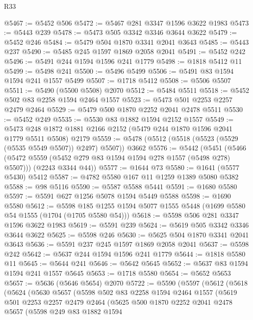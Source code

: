 \begin{lexlean}{R33}
\begin{coremodule}
@5467 := @5452 @506
@5472 := @5467 @281 @3347 @1596 @3622 @1983
@5473 := @5443 @239
@5478 := @5473 @505 @3342 @3346 @3644 @3622
@5479 := @5452 @246
@5484 := @5479 @504 @1870 @3341 @2041 @3643
@5485 := @5443 @237
@5490 := @5485 @245 @1597 @1869 @2058 @2041
@5491 := @5452 @242
@5496 := @5491 @244 @1594 @1596 @241 @1779
@5498 := @1818 @5412 @11
@5499 := @5498 @241
@5500 := @5496 @5499
@5506 := @5491 @83 @1594 @1594 @241 @1557 @5499
@5507 := @1718 @5412
@5508 := @5506 @5507
@5511 := @5490 (@5500 @5508) @2070
@5512 := @5484 @5511
@5518 := @5452 @502 @83 @2258 @1594 @2464 @1557
@5523 := @5473 @501 @2253 @2257 @2479 @2464
@5529 := @5479 @500 @1870 @2252 @2041 @2478 @5511
@5530 := @5452 @249
@5535 := @5530 @83 @1882 @1594 @2152 @1557
@5549 := @5473 @248 @1872 @1881 @2166 @2152 (@5479 @244 @1870 @1596 @2041 @1779 @5511 @5508) @2179
@5559 := @5478 (@5512 (@5518 (@5523 (@5529 (@5535 @5549 @5507)) @2497) @5507)) @3662
@5576 := @5442
    (@5451
      (@5466 (@5472 @5559 (@5452 @279 @83 @1594 @1594 @278 @1557 (@5498 @278) @5507)))
      (@2243 @3344 @44))
@5577 := @1644 @73
@5580 := @1641 (@5577 @5430) @5412
@5587 := @4782 @5580 @167 @11 @1259 @1389 @5080 @5382
@5588 := @98 @5116
@5590 := @5587 @5588 @5441
@5591 := @1680 @5580
@5597 := @5591 @627 @1256 @5078 @1594 @5449 @5588
@5598 := @1690 @5580
@5612 := @5598 @185 @1255 @1594 @5077 @1555 @5448 (@1699 @5580 @54 @1555 (@1704 (@1705 @5580 @54)))
@5618 := @5598 @506 @281 @3347 @1596 @3622 @1983
@5619 := @5591 @239
@5624 := @5619 @505 @3342 @3346 @3644 @3622
@5625 := @5598 @246
@5630 := @5625 @504 @1870 @3341 @2041 @3643
@5636 := @5591 @237 @245 @1597 @1869 @2058 @2041
@5637 := @5598 @242
@5642 := @5637 @244 @1594 @1596 @241 @1779
@5644 := @1818 @5580 @11
@5645 := @5644 @241
@5646 := @5642 @5645
@5652 := @5637 @83 @1594 @1594 @241 @1557 @5645
@5653 := @1718 @5580
@5654 := @5652 @5653
@5657 := @5636 (@5646 @5654) @2070
@5722 := @5590
    (@5597
      (@5612
        (@5618
          (@5624
            (@5630
              @5657
              (@5598
                @502
                @83
                @2258
                @1594
                @2464
                @1557
                (@5619
                  @501
                  @2253
                  @2257
                  @2479
                  @2464
                  (@5625
                    @500
                    @1870
                    @2252
                    @2041
                    @2478
                    @5657
                    (@5598
                      @249
                      @83
                      @1882
                      @1594

\end{coremodule}
\end{lexlean}
